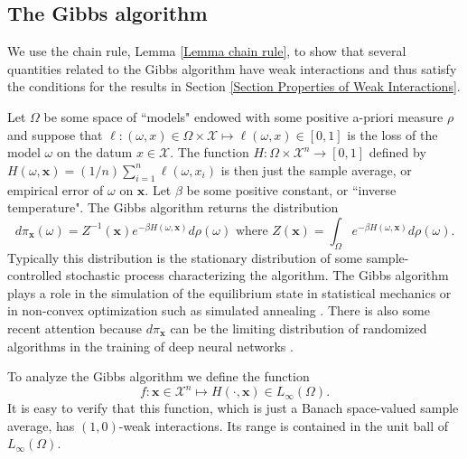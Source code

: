 \documentclass[final,12pt]{colt2018} %
\begin{document}
						\subsection{The Gibbs algorithm\label{Subsection Gibbs algorithm}}
						
						We use the chain rule, Lemma \ref{Lemma chain rule}, to show that several quantities
						related to the Gibbs algorithm have weak interactions and thus satisfy the
						conditions for the results in Section \ref{Section Properties of Weak
							Interactions}.
						
						Let $\Omega $ be some space of ``models" endowed with some positive a-priori
						measure $\rho $ and suppose that $\ell :\left( \omega ,x\right) \in \Omega
						\times \mathcal{X}\mapsto \ell \left( \omega ,x\right) \in \left[ 0,1\right] 
						$ is the loss of the model $\omega $ on the datum $x\in \mathcal{X}$. The
						function $H:\Omega \times \mathcal{X}^{n}\rightarrow \left[ 0,1\right] $
						defined by $H\left( \omega ,\mathbf{x}\right) =\left( 1/n\right)
						\sum_{i=1}^n\ell \left( \omega ,x_{i}\right) $ is then just the sample average,
						or empirical error of $\omega $ on $\mathbf{x}$. Let $\beta $ be some
						positive constant, or ``inverse temperature". The Gibbs algorithm returns the
						distribution 
						\begin{equation*}
						d\pi _{\mathbf{x}}\left( \omega \right) =Z^{-1}\left( \mathbf{x}\right)
						e^{-\beta H\left( \omega ,\mathbf{x}\right) }d\rho \left( \omega \right) 
						\text{ where }Z\left( \mathbf{x}\right) =\int_{\Omega }e^{-\beta H\left(
							\omega ,\mathbf{x}\right) }d\rho \left( \omega \right) . 
						\end{equation*}%
						Typically this distribution is the stationary distribution of some
						sample-controlled stochastic process characterizing the algorithm. The Gibbs
						algorithm plays a role in the simulation of the equilibrium state in
						statistical mechanics \citep{Binder 1997} or in non-convex optimization
						such as simulated annealing \citep{Kirkpatrick 1983}. There is also some recent attention because $d\pi _{\mathbf{x}%
						}$ can be the limiting distribution of randomized algorithms in the training
						of deep neural networks \citep{Rakhlin 2017}.
						
						To analyze the Gibbs algorithm we define the function%
						\begin{equation}
						\label{eq:www}
						f:\mathbf{x}\in \mathcal{X}^{n}\mapsto H\left( \cdot,\mathbf{x}\right) \in
						L_{\infty }\left( \Omega \right) . 
						\end{equation}%
						It is easy to verify that this function, which is just a Banach space-valued
						sample average, has $\left( 1,0\right) $-weak interactions. Its range is
						contained in the unit ball of $L_{\infty }\left( \Omega \right) $.
						
\end{document}
